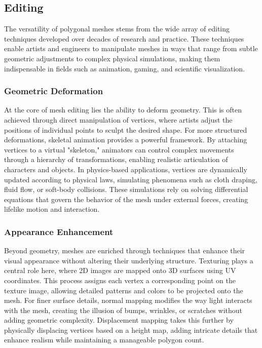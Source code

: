 \subsection{Editing}

The versatility of polygonal meshes stems from the wide array of editing techniques developed over decades of research and practice. These techniques enable artists and engineers to manipulate meshes in ways that range from subtle geometric adjustments to complex physical simulations, making them indispensable in fields such as animation, gaming, and scientific visualization.

\subsubsection{Geometric Deformation}

At the core of mesh editing lies the ability to deform geometry. This is often achieved through direct manipulation of vertices, where artists adjust the positions of individual points to sculpt the desired shape. For more structured deformations, skeletal animation provides a powerful framework. By attaching vertices to a virtual "skeleton," animators can control complex movements through a hierarchy of transformations, enabling realistic articulation of characters and objects. In physics-based applications, vertices are dynamically updated according to physical laws, simulating phenomena such as cloth draping, fluid flow, or soft-body collisions. These simulations rely on solving differential equations that govern the behavior of the mesh under external forces, creating lifelike motion and interaction.

\subsubsection{Appearance Enhancement}

Beyond geometry, meshes are enriched through techniques that enhance their visual appearance without altering their underlying structure. Texturing plays a central role here, where 2D images are mapped onto 3D surfaces using UV coordinates. This process assigns each vertex a corresponding point on the texture image, allowing detailed patterns and colors to be projected onto the mesh. For finer surface details, normal mapping modifies the way light interacts with the mesh, creating the illusion of bumps, wrinkles, or scratches without adding geometric complexity. Displacement mapping takes this further by physically displacing vertices based on a height map, adding intricate details that enhance realism while maintaining a manageable polygon count.

